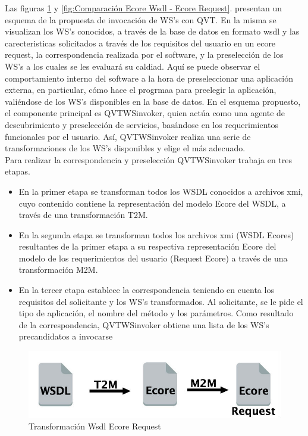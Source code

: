 Las figuras \ref{fig:Transformación Wsdl Ecore Request} y \ref{fig:Comparación Ecore Wsdl - Ecore Request}. presentan un esquema de la propuesta de invocación de WS's con QVT. En la misma se visualizan los WS's conocidos, a través de la base de datos en formato wsdl y las carecteristicas solicitados a través de los requisitos del usuario en un ecore request, la correspondencia realizada por el software, y la preselección de los WS's a los cuales se les evaluará su caldiad. Aquí se puede observar el comportamiento interno del software a la hora de preseleccionar una aplicación externa, en particular, cómo hace el progrmaa para preelegir la aplicación, valiéndose de los WS's disponibles en la base de datos. En el esquema propuesto, el componente principal es QVTWSinvoker, quien actúa como una agente de descubrimiento y preselección de servicios, basándose en los requerimientos funcionales por el usuario. Así, QVTWSinvoker  realiza una serie de transformaciones de los WS's disponibles y elige el más adecuado. \\
Para realizar la correspondencia y preselección QVTWSinvoker trabaja en tres etapas.
\begin{itemize}
	\item En la primer etapa se transforman todos los WSDL conocidos a archivos xmi, cuyo contenido contiene la representación del modelo Ecore del WSDL, a través de una transformación T2M.
	
	\item En la segunda etapa se transforman todos los archivos xmi (WSDL Ecores) resultantes de la primer etapa a su respectiva representación Ecore del modelo de los requerimientos del usuario (Request Ecore) a través de una transformación M2M.
	
	\item En la tercer etapa establece la correspondencia teniendo en cuenta los requisitos del solicitante y los WS's transformados. Al solicitante, se le pide el tipo de aplicación, el nombre del método y los parámetros. Como resultado de la correspondencia, QVTWSinvoker obtiene una lista de los WS's precandidatos a invocarse
\end{itemize}

\begin{figure}[!h] 
	\begin{center}
		\includegraphics [scale=0.50]{imagenes/Transformacion_Wsdl_Ecore_Request.jpg}
	\end{center}
	\caption{Transformación Wsdl Ecore Request}
	\label{fig:Transformación Wsdl Ecore Request}
\end{figure} 

